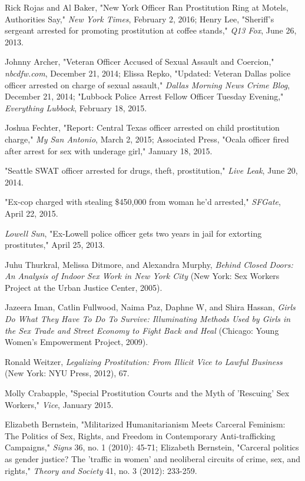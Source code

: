 \documentclass[fontset=fandol, a4paper, 12pt, openright]{ctexbook}
\begin{document}
\begin{enumerate}[label={[\arabic*]}]
    \item Rick Rojas and Al Baker, "New York Officer Ran Prostitution Ring at Motels, Authorities Say," \textit{New York Times}, February 2, 2016; Henry Lee, "Sheriff's sergeant arrested for promoting prostitution at coffee stands," \textit{Q13 Fox}, June 26, 2013.
    \item Johnny Archer, "Veteran Officer Accused of Sexual Assault and Coercion," \textit{nbcdfw.com}, December 21, 2014; Elissa Repko, "Updated: Veteran Dallas police officer arrested on charge of sexual assault," \textit{Dallas Morning News Crime Blog}, December 21, 2014; "Lubbock Police Arrest Fellow Officer Tuesday Evening," \textit{Everything Lubbock}, February 18, 2015.
    \item Joshua Fechter, "Report: Central Texas officer arrested on child prostitution charge," \textit{My San Antonio}, March 2, 2015; Associated Press, "Ocala officer fired after arrest for sex with underage girl," January 18, 2015.
    \item "Seattle SWAT officer arrested for drugs, theft, prostitution," \textit{Live Leak}, June 20, 2014.
    \item "Ex-cop charged with stealing \$450,000 from woman he'd arrested," \textit{SFGate}, April 22, 2015.
    \item \textit{Lowell Sun}, "Ex-Lowell police officer gets two years in jail for extorting prostitutes," April 25, 2013.
    \item Juhu Thurkral, Melissa Ditmore, and Alexandra Murphy, \textit{Behind Closed Doors: An Analysis of Indoor Sex Work in New York City} (New York: Sex Workers Project at the Urban Justice Center, 2005).
    \item Jazeera Iman, Catlin Fullwood, Naima Paz, Daphne W, and Shira Hassan, \textit{Girls Do What They Have To Do To Survive: Illuminating Methods Used by Girls in the Sex Trade and Street Economy to Fight Back and Heal} (Chicago: Young Women's Empowerment Project, 2009).
    \item Ronald Weitzer, \textit{Legalizing Prostitution: From Illicit Vice to Lawful Business} (New York: NYU Press, 2012), 67.
    \item Molly Crabapple, "Special Prostitution Courts and the Myth of 'Rescuing' Sex Workers," \textit{Vice}, January 2015.
    \item Elizabeth Bernstein, "Militarized Humanitarianism Meets Carceral Feminism: The Politics of Sex, Rights, and Freedom in Contemporary Anti-trafficking Campaigns," \textit{Signs} 36, no. 1 (2010): 45-71; Elizabeth Bernstein, "Carceral politics as gender justice? The 'traffic in women' and neoliberal circuits of crime, sex, and rights," \textit{Theory and Society} 41, no. 3 (2012): 233-259.

\end{enumerate}
\end{document}
